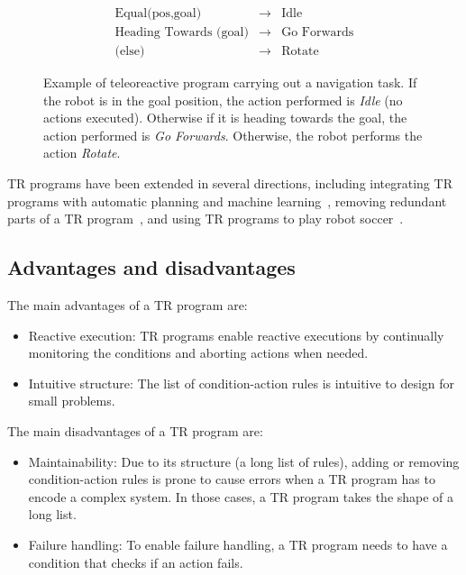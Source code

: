 \begin{figure}[h]
\centering
\begin{eqnarray*}
 \mbox{Equal(pos,goal)} &\rightarrow& \mbox{Idle} \\
 \mbox{Heading Towards (goal)} &\rightarrow& \mbox{Go Forwards} \\
 \mbox{(else)} &\rightarrow& \mbox{Rotate} 
\end{eqnarray*}
   \caption{Example of teleoreactive program carrying out a navigation task. If the robot is in the goal position, the action performed is \emph{Idle} (no actions executed). Otherwise if it is heading towards the goal, the action performed is \emph{Go Forwards}. Otherwise, the robot performs the action \emph{Rotate}.}
    \label{Arch.fig.tr}
\end{figure}
 
TR programs have been extended in several directions, including integrating TR programs with automatic planning and machine learning~\cite{benson1993reacting,vargas2008solving}, removing redundant parts of a TR program~\cite{mousavi2003simplification}, and using TR programs to play
robot soccer~\cite{gubisch2008teleo}.


\subsection{Advantages and disadvantages}
The main advantages of a TR program are:
\begin{itemize}
\item Reactive execution: TR programs enable  reactive executions by continually monitoring the conditions and aborting actions when needed.
\item Intuitive structure: The list of condition-action rules is intuitive to design for small problems.
\end{itemize}
The main disadvantages of a TR program are:
\begin{itemize}
\item Maintainability: Due to its structure (a long list of rules), adding or removing condition-action rules is prone to cause errors when a TR program has to encode a complex system. In those cases, a TR program takes the shape of a long list.
\item Failure handling: To enable failure handling, a TR program needs to have a condition that checks if an action fails.%
\end{itemize}

